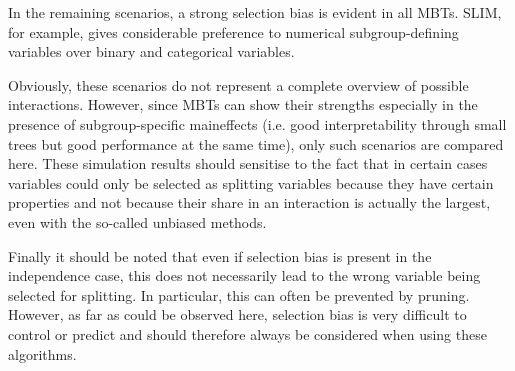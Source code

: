 In the remaining scenarios, a strong selection bias is evident in all MBTs. SLIM, for example, gives considerable preference to numerical subgroup-defining variables over binary and categorical variables.





Obviously, these scenarios do not represent a complete overview of possible interactions. However, since MBTs can show their strengths especially in the presence of subgroup-specific maineffects (i.e. good interpretability through small trees but good performance at the same time), only such scenarios are compared here. These simulation results should sensitise to the fact that in certain cases variables could only be selected as splitting variables because they have certain properties and not because their share in an interaction is actually the largest, even with the so-called unbiased methods.

Finally it should be noted that even if selection bias is present in the independence case, this does not necessarily lead to the wrong variable being selected for splitting. In particular, this can often be prevented by pruning. However, as far as could be observed here, selection bias is very difficult to control or predict and should therefore always be considered when using these algorithms.










